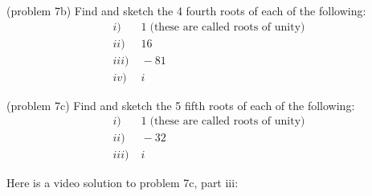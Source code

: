 \documentclass[handout]{ximera}
\begin{document}
\begin{problem}(problem 7b)
Find and sketch the 4 fourth roots of each of the following:\\
\begin{align*}
i) &\; 1 \; \mbox{(these are called roots of unity)} \\
ii)&\; 16 \\
iii) &\; -81 \\
iv) & \;i
\end{align*}
\end{problem}

\begin{problem}(problem 7c)
Find and sketch the 5 fifth roots of each of the following:\\
\begin{align*}
i) & \;1 \; \mbox{(these are called roots of unity)} \\
ii)& \;-32 \\
iii) & \;i
\end{align*}
\end{problem}

Here is a video solution to problem 7c, part iii:\\
\begin{foldable}
\end{foldable}
\end{document}
